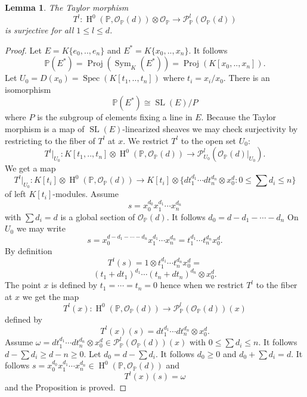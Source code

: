 \documentclass{amsart}
\theoremstyle{plain}
\newtheorem{lemma}[theorem]{Lemma}
\theoremstyle{definition}
\theoremstyle{remark}
\numberwithin{equation}{theorem}
\begin{document}
\begin{lemma} \label{projective} The Taylor morphism
\[ T^l:{\operatorname{H} }^0({\mathbb{P}},{\mathcal{O} }_{\mathbb{P}}(d))\otimes {\mathcal{O} }_{\mathbb{P}} \rightarrow {\mathcal{P} }^l_{\mathbb{P}}({\mathcal{O} }_{\mathbb{P}}(d)) \]
is surjective for all $1\leq l \leq d$.
\end{lemma}
\begin{proof} Let $E=K\{e_0,..,e_n\}$ and $E^*=K\{x_0,..,x_n\}$. It
  follows
\[ {\mathbb{P}}(E^*)={\operatorname{Proj} }({\operatorname{Sym} }_K(E^*))={\operatorname{Proj} }(K[x_0,..,x_n]).\]
Let $U_0=D(x_0)={\operatorname{Spec} }(K[t_1,..,t_n])$ where $t_i=x_i/x_0$. There is an
isomorphism 
\[ {\mathbb{P}}(E^*)\cong {\operatorname{SL}}(E)/P \]
where $P$ is the subgroup of elements fixing a line in $E$. 
Because the Taylor morphism is a map of ${\operatorname{SL}}(E)$-linearized sheaves we
may check surjectivity by restricting to the fiber of $T^l$ at $x$. We
restrict $T^l$ to the open set $U_0$:
\[ T^l|_{U_0}:K[t_1,..,t_n]\otimes {\operatorname{H} }^0({\mathbb{P}},{\mathcal{O} }_{\mathbb{P}}(d))\rightarrow
{\mathcal{P} }^l_{U_0}({\mathcal{O} }_{\mathbb{P}}(d)|_{U_0}).\]
We get a map
\[ T^l|_{U_0}:K[t_i]\otimes {\operatorname{H} }^0({\mathbb{P}},{\mathcal{O} }_{\mathbb{P}}(d))\rightarrow K[t_i]\otimes 
\{dt_1^{d_1}\cdots dt_n^{d_n}\otimes x_0^d : 0\leq \sum d_i \leq n\} \]
of left $K[t_i]$-modules.
Assume
\[ s= x_0^{d_0}x_1^{d_1}\cdots x_n^{d_n} \]
with $\sum d_i=d$ is a global section of ${\mathcal{O} }_{\mathbb{P}}(d)$. It follows
$d_0=d-d_1-\cdots -d_n$ On $U_0$ we may
write
\[ s=x_0^{d-d_1-\cdots -d_n}x_1^{d_1}\cdots x_n^{d_n}=t_1^{d_1}\cdots
t_n^{d_n}x_0^d.\]
By definition
\[ T^l(s)=1\otimes t_1^{d_1}\cdots t_n^{d_n}x_0^d=\]
\[ (t_1+dt_1)^{d_1}\cdots (t_n+dt_n)^{d_n}\otimes x_0^d .\]
The point $x$ is defined by $t_1=\cdots =t_n=0$ hence when we restrict
$T^l$ to the fiber at $x$ we get the map
\[ T^l(x):{\operatorname{H} }^0({\mathbb{P}},{\mathcal{O} }_{\mathbb{P}}(d))\rightarrow {\mathcal{P} }^l_{\mathbb{P}}({\mathcal{O} }_{\mathbb{P}}(d))(x) \]
defined by
\[ T^l(x)(s)=dt_1^{d_1}\cdots dt_n^{d_n}\otimes x_0^d.\]
Assume $\omega=dt_1^{d_1}\cdots dt_n^{d_n}\otimes x_0^d \in {\mathcal{P} }^l_{\mathbb{P}}({\mathcal{O} }_{\mathbb{P}}(d))(x)$
with $0\leq \sum d_i \leq n$. It follows $d-\sum d_i \geq d-n \geq 0$.
Let $d_0=d-\sum d_i$. It follows $d_0\geq 0$ and $d_0+\sum d_i=d$. It
follows $s=x_0^{d_0}x_1^{d_1}\cdots x_n^{d_n}\in {\operatorname{H} }^0({\mathbb{P}},{\mathcal{O} }_{\mathbb{P}}(d))$ and
\[ T^l(x)(s)=\omega \]
and the Proposition is proved.
\end{proof}
\end{document}
